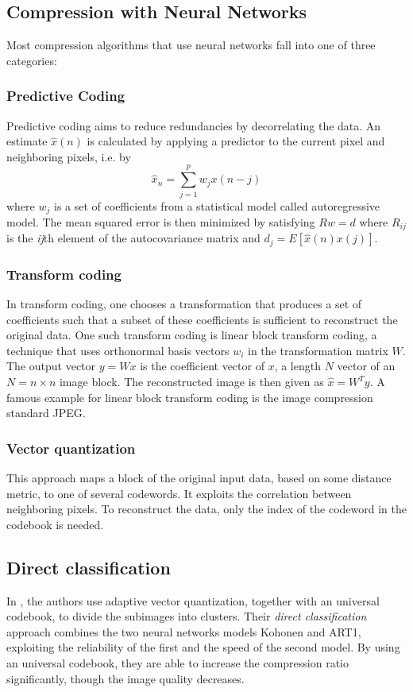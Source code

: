 \subsection{Compression with Neural Networks}
Most compression algorithms that use neural networks fall into one of three categories\cite{Dony1995}: 

\subsubsection{Predictive Coding}
Predictive coding aims to reduce redundancies by decorrelating the data. An estimate \(\hat{x}(n)\) is calculated by applying a predictor to the current pixel and neighboring pixels, i.e. by
\begin{equation}
\hat{x}_n = \sum_{j=1}^{p} w_j x(n-j)
\end{equation}
where \({w_j}\) is a set of coefficients from a statistical model called autoregressive model. The mean squared error is then minimized by satisfying \(Rw = d\) where \(R_{ij}\) is the \emph{ij}th element of the autocovariance matrix and \(d_j = E[\hat{x}(n)x(j)]\).

\subsubsection{Transform coding}
In transform coding, one chooses a transformation that produces a set of coefficients such that a subset of these coefficients is sufficient to reconstruct the original data. One such transform coding is linear block transform coding, a technique that uses orthonormal basis vectors \(w_i\) in the transformation matrix \(W\). The output vector \(y = Wx\) is the coefficient vector of \(x\), a length \(N\) vector of an \(N = n \times n\) image block. The reconstructed image is then given as \(\hat{x} = W^Ty\). 
A famous example for linear block transform coding is the image compression standard JPEG.

\subsubsection{Vector quantization}
This approach maps a block of the original input data, based on some distance metric, to one of several codewords. It exploits the correlation between neighboring pixels. To reconstruct the data, only the index of the codeword in the codebook is needed. 

\subsection{Direct classification}
In \cite{Soliman2006258}, the authors use adaptive vector quantization, together with an universal codebook, to divide the subimages into clusters. Their \emph{direct classification} approach combines the two neural networks models Kohonen and ART1, exploiting the reliability of the first and the speed of the second model. By using an universal codebook, they are able to increase the compression ratio significantly, though the image quality decreases.

